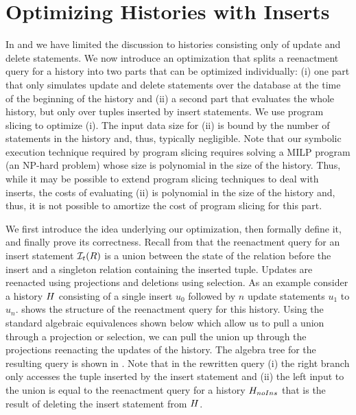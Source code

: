 \section{Optimizing Histories with Inserts}
\label{sec:optim-reen-hist}

\newcommand{\honlyup}{\history_{noIns}}
\newcommand{\reenactNoR}[1]{\ract{#1 / R}}

In  and  we have limited the discussion to histories consisting only of update and delete statements. We now introduce an optimization that splits a reenactment query for a history into two parts that can be optimized individually: (i) one part that only simulates update and delete statements over the database at the time of the beginning of the history and (ii) a second part that evaluates the whole history, but only over tuples inserted by insert statements. We use program slicing to optimize (i). The input data size for (ii) is bound by the number of statements in the history and, thus, typically negligible. Note that our symbolic execution technique required by program slicing requires solving a MILP program (an NP-hard problem) whose size is polynomial in the size of the history. Thus, while it may be possible to extend program slicing techniques to deal with inserts, the costs of evaluating (ii) is polynomial in the size of the history and, thus, it is not possible to amortize the cost of program slicing for this part.

We first introduce the idea underlying our optimization, then formally define it, and finally prove its correctness.
Recall from  that the reenactment query for an insert statement $\mathcal{I}_{t}(R)$ is a union between the state of the relation before the insert and a singleton relation containing the inserted tuple. Updates are reenacted using projections and deletions using selection. As an example consider a history $H$ consisting of a single insert $u_0$ followed by $n$ update statements $u_1$ to $u_n$.  shows the structure of the reenactment query for this history. Using the standard algebraic equivalences shown below which allow us to pull a union through a projection or selection, we can pull the union up through the projections reenacting the updates of the history. The algebra tree for the resulting query is shown in . Note that in the rewritten query (i) the right branch only accesses the tuple inserted by the insert statement and (ii) the left input to the union is equal to the reenactment query for a history $\honlyup$ that is the result of deleting the insert statement from $H$.\\[-6mm]

